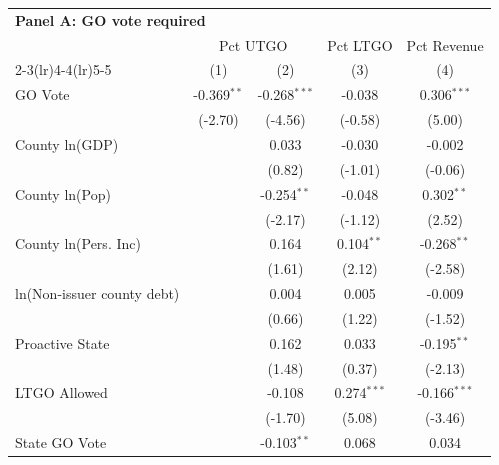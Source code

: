 \begingroup
\centering
\begin{tabular*}{\textwidth}{@{\extracolsep{\fill}}lcccc}
\multicolumn{5}{l}{\textbf{Panel A: GO vote required}}\\

\addlinespace
   \toprule
    & \multicolumn{2}{c}{Pct UTGO} & Pct LTGO & Pct Revenue\\
   \cmidrule(lr){2-3}\cmidrule(lr){4-4}\cmidrule(lr){5-5}
                              & (1)           & (2)            & (3)           & (4)\\  
   \midrule 
   GO Vote                    & -0.369$^{**}$ & -0.268$^{***}$ & -0.038        & 0.306$^{***}$\\   
                              & (-2.70)       & (-4.56)        & (-0.58)      & (5.00)\\   
   County ln(GDP)             &               & 0.033          & -0.030        & -0.002\\   
                              &               & (0.82)        & (-1.01)       & (-0.06)\\   
   County ln(Pop)             &               & -0.254$^{**}$  & -0.048        & 0.302$^{**}$\\   
                              &               & (-2.17)        & (-1.12)       & (2.52)\\   
   County ln(Pers. Inc)       &               & 0.164          & 0.104$^{**}$  & -0.268$^{**}$\\   
                              &               & (1.61)         & (2.12)        & (-2.58)\\   
   ln(Non-issuer county debt) &               & 0.004          & 0.005         & -0.009\\   
                              &               & (0.66)        & (1.22)        & (-1.52)\\   
   Proactive State            &               & 0.162          & 0.033         & -0.195$^{**}$\\   
                              &               & (1.48)         & (0.37)       & (-2.13)\\   
   LTGO Allowed               &               & -0.108         & 0.274$^{***}$ & -0.166$^{***}$\\   
                              &               & (-1.70)        & (5.08)        & (-3.46)\\   
   State GO Vote              &               & -0.103$^{**}$  & 0.068         & 0.034\\   

\end{tabular*}
